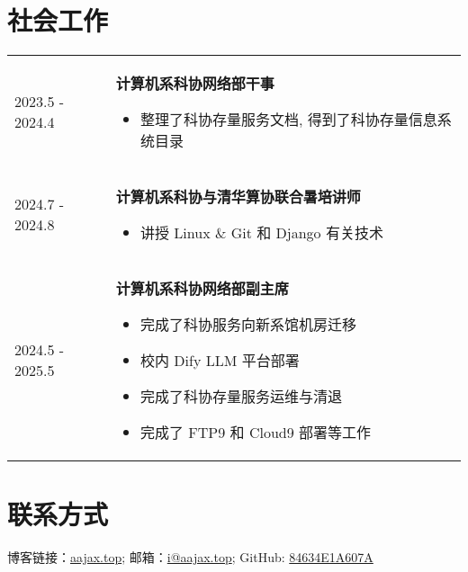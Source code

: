\documentclass[a4paper, 10pt]{article}
\begin{document}
\section*{社会工作}
\noindent
\begin{tabular}{p{}p{}}
    2023.5 - 2024.4 & \textbf{计算机系科协网络部干事}
        \fontsize{8pt}{10pt}\selectfont
        \begin{itemize}[left=0pt,topsep=0pt,partopsep=0pt,parsep=0pt,itemsep=0pt]
            \item 整理了科协存量服务文档, 得到了科协存量信息系统目录
        \end{itemize} \\

    2024.7 - 2024.8 & \textbf{计算机系科协与清华算协联合暑培讲师}
        \fontsize{8pt}{10pt}\selectfont
        \begin{itemize}[left=0pt,topsep=0pt,partopsep=0pt,parsep=0pt,itemsep=0pt]
            \item 讲授 Linux \& Git 和 Django 有关技术
        \end{itemize} \\

    2024.5 - 2025.5 & \textbf{计算机系科协网络部副主席}
        \fontsize{8pt}{10pt}\selectfont
        \begin{itemize}[left=0pt,topsep=0pt,partopsep=0pt,parsep=0pt,itemsep=0pt]
            \item 完成了科协服务向新系馆机房迁移
            \item 校内 Dify LLM 平台部署
            \item 完成了科协存量服务运维与清退
            \item 完成了 FTP9 和 Cloud9 部署等工作
        \end{itemize}
\end{tabular}

\section*{联系方式}
\noindent 博客链接：\href{https://aajax.top}{aajax.top}; 邮箱：\href{mailto:i@aajax.top}{i@aajax.top}; GitHub: \href{https://github.com/84634E1A607A/}{84634E1A607A}
\end{document}
